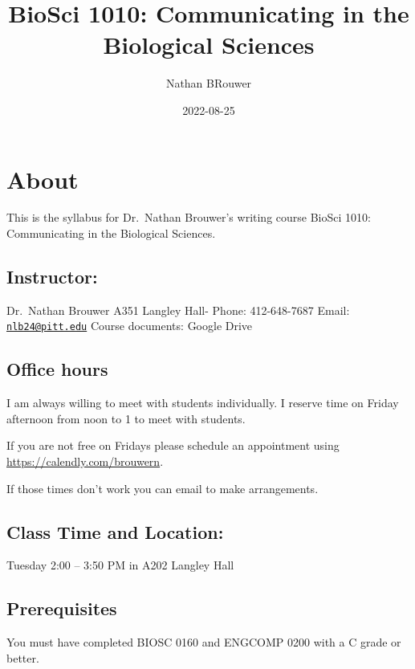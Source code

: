 \documentclass[
]{book}
\title{BioSci 1010: Communicating in the Biological Sciences}
\author{Nathan BRouwer}
\date{2022-08-25}
\begin{document}
\maketitle

{
\setcounter{tocdepth}{1}
\tableofcontents
}
\hypertarget{about}{%
\chapter{About}\label{about}}

This is the syllabus for Dr.~Nathan Brouwer's writing course BioSci 1010: Communicating in the Biological Sciences.

\hypertarget{instructor}{%
\section{Instructor:}\label{instructor}}

Dr.~Nathan Brouwer
A351 Langley Hall-
Phone: 412-648-7687
Email: \href{mailto:nlb24@pitt.edu}{\nolinkurl{nlb24@pitt.edu}}
Course documents: Google Drive

\hypertarget{office-hours}{%
\section{Office hours}\label{office-hours}}

I am always willing to meet with students individually. I reserve time on Friday afternoon from noon to 1 to meet with students.

If you are not free on Fridays please schedule an appointment using \url{https://calendly.com/brouwern}.

If those times don't work you can email to make arrangements.

\hypertarget{class-time-and-location}{%
\section{Class Time and Location:}\label{class-time-and-location}}

Tuesday 2:00 -- 3:50 PM in A202 Langley Hall

\hypertarget{prerequisites}{%
\section{Prerequisites}\label{prerequisites}}

You must have completed BIOSC 0160 and ENGCOMP 0200 with a C grade or better.
\end{document}
